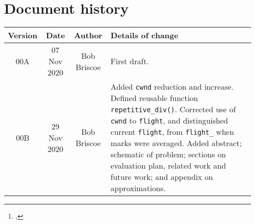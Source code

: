 \documentclass[a4paper,twoside,twocolumn]{article}
\title{\metatitle}%
\author{\metaauthori%
\thanks{\metamaili, %
\metaaddress}%
}
\date{\metadate}%
\newcommand*{\metaversion}{00B}
\newcommand*{\metadate}{29 Nov 2020}
\begin{document}
%


\maketitle%
\thispagestyle{first}

\begin{abstract}
{\small\noindent%
}      %
\end{abstract}

{}

{\footnotesize%
}

\clearpage
\appendix

\onecolumn%
\section*{Document history}

\begin{tabular}{|c|c|c|p{3.5in}|}
 \hline
Version &Date &Author &Details of change \\
 \hline\hline
00A          &07 Nov 2020&Bob Briscoe &First draft.\\\hline%
\metaversion &\metadate  &Bob Briscoe &Added \texttt{cwnd} reduction and increase. Defined reusable function \texttt{repetitive\_div()}. Corrected use of \texttt{cwnd} to \texttt{flight}, and distinguished current \texttt{flight}, from \texttt{flight\_} when marks were averaged. Added abstract; schematic of problem; sections on evaluation plan, related work and future work; and appendix on approximations.\\\hline%
\hline%
\end{tabular}
\end{document}
